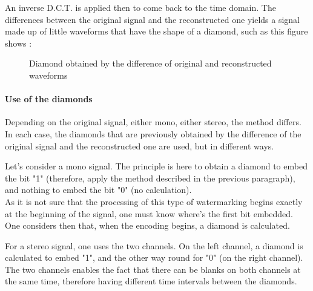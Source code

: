 An inverse D.C.T. is applied then to come back to the time domain. The differences between the original signal and the reconstructed one yields a signal made up of little waveforms that have the shape of a diamond, such as this figure shows :
\begin{figure}[H]
\caption{\label{diamond} Diamond obtained by the difference of original and reconstructed waveforms}
\end{figure}

\paragraph{Use of the diamonds}
Depending on the original signal, either mono, either stereo, the method differs. In each case, the diamonds that are previously obtained by the difference of the original signal and the reconstructed one are used, but in different ways.

Let's consider a mono signal. The principle is here to obtain a diamond to embed the bit "1" (therefore, apply the method described in the previous paragraph), and nothing to embed the bit "0" (no calculation).\\
As it is not sure that the processing of this type of watermarking begins exactly at the beginning of the signal, one must know where's the first bit embedded. One considers then that, when the encoding begins, a diamond is calculated.

For a stereo signal, one uses the two channels. On the left channel, a diamond is calculated to embed "1", and the other way round for "0" (on the right channel). The two channels enables the fact that there can be blanks on both channels at the same time, therefore having different time intervals between the diamonds.

